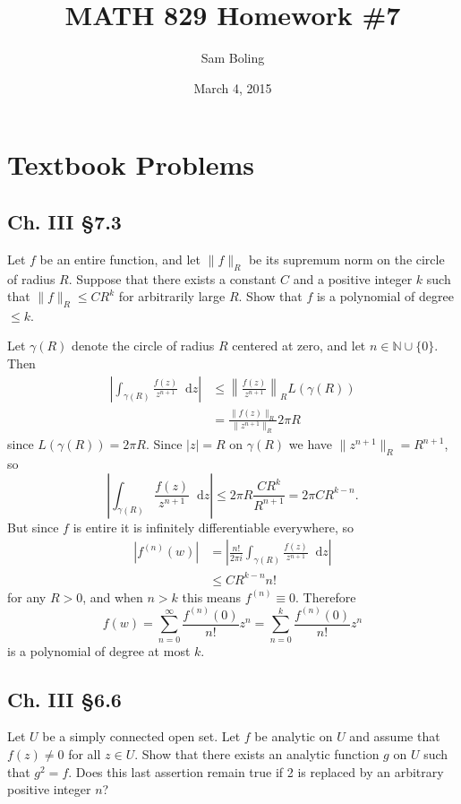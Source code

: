 \documentclass{article}
\title{MATH 829 Homework \#7}
\date{March 4, 2015}
\author{Sam Boling}
\newcommand\dif{\mathop{}\!\mathrm{d}}
\newcommand\horline{\noindent\makebox[\linewidth]{\rule{\textwidth}{0.4pt}}}
\newcounter{Problem}
\begin{document}
\begin{titlepage}
\maketitle
\end{titlepage}

\section{Textbook Problems}
\subsection*{Ch. III \S 7.3}
Let $f$ be an entire function, and let $\|f\|_R$ be its supremum
norm on the circle of radius $R$. Suppose that there exists a
constant $C$ and a positive integer $k$ such that
$\|f\|_R \leq C R^k$ for arbitrarily large $R$. Show that $f$ is a
polynomial of degree $\leq k$.

\horline

Let $\gamma(R)$ denote the circle of radius $R$ centered at zero, and
let $n \in \mathbb{N} \cup \{ 0 \}$.
Then
\begin{align*}
      \left|
        \int_{\gamma(R)} 
          \frac{f(z)}
               {z^{n+1}} 
          \dif z
      \right|
&\leq \left\|
        \frac{f(z)}{z^{n+1}}
      \right\|_{R}
      L(\gamma(R)) \\
&=    \frac{\|f(z)\|_{R}}
           {\|z^{n+1}\|_{R}}
      2 \pi R
\end{align*}
since $L(\gamma(R)) = 2 \pi R$. Since $|z| = R$ on $\gamma(R)$
we have $\|z^{n+1}\|_{R} = R^{n+1}$, so
$$
      \left|
        \int_{\gamma(R)} 
          \frac{f(z)}
               {z^{n+1}} 
          \dif z
      \right|
\leq  2 \pi R \frac{C R^k}{R^{n+1}} 
=     2 \pi C R^{k - n}.
$$
But since $f$ is entire it is infinitely differentiable
everywhere, so
\begin{align*}
   |f^{(n)}(w)|
&= \left|
     \frac{n!}
          {2 \pi i}
     \int_{\gamma(R)}
       \frac{f(z)}
            {z^{n+1}}
       \dif z
   \right| \\
&\leq
   C R^{k - n} n! 
\end{align*}
for any $R > 0$, and when $n > k$ this means $f^{(n)} \equiv 0$.
Therefore
$$
  f(w) 
= \sum_{n=0}^\infty \frac{f^{(n)}(0)}{n!} z^n 
= \sum_{n=0}^k     \frac{f^{(n)}(0)}{n!} z^n
$$ 
is a polynomial of degree at most $k$.

\subsection*{Ch. III \S 6.6}
Let $U$ be a simply connected open set. Let $f$ be analytic on
$U$ and assume that $f(z) \neq 0$ for all $z \in U$. Show that there
exists an analytic function $g$ on $U$ such that $g^2 = f$. Does this
last assertion remain true if 2 is replaced by an arbitrary positive
integer $n$?
\end{document}
